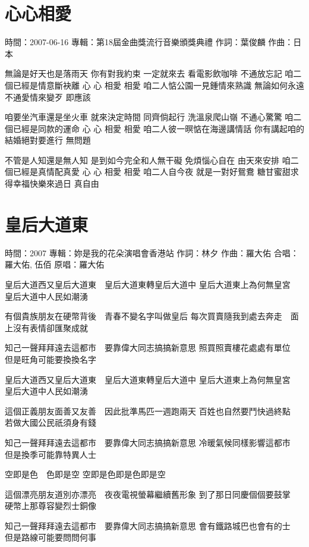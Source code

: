 \documentclass[UTF8,a4paper,oneside,twocolumn,12pt]{ctexbook}
\newcommand{\infopair}[2]{\textbullet #1：#2}
\newcommand{\zc}[1][伍佰]{\infopair{作詞}{#1}}
\newcommand{\zq}[1][伍佰]{\infopair{作曲}{#1}}
\newcommand{\zj}[1]{\infopair{專輯}{#1}}
\newcommand{\yc}[1]{\infopair{原唱}{#1}}
\newcommand{\sj}[1]{\infopair{時間}{#1}}
\newenvironment{info}{\begin{flushleft}\kaishu
	}
	{\end{flushleft}\normalsize\yahei\par}
\newenvironment{lyric}{
	}
{}
\begin{document}
\section{心心相愛}%
\begin{info}
	\sj{2007-06-16}
	\zj{第18屆金曲獎流行音樂頒獎典禮}
	\zc[葉俊麟]
	\zq[日本]
\end{info}
\begin{lyric} %
	無論是好天也是落雨天
	你有對我約束
	一定就來去
	看電影飲咖啡 不通放忘記
	咱二個已經是情意斷袂離
	心 心 相愛 相愛
	咱二人惦公園一見鍾情來熟識
	無論如何永遠不通愛情來變歹
	即應該

	咱要坐汽車還是坐火車
	就來決定時間
	同齊倘起行
	洗溫泉爬山嶺 不通心驚驚
	咱二個已經是同款的運命
	心 心 相愛 相愛
	咱二人彼一暝惦在海邊講情話
	你有講起咱的結婚絕對要進行
	無問題

	不管是人知還是無人知
	是到如今完全和人無干礙
	免煩惱心自在 由天來安排
	咱二個已經是真情配真愛
	心 心 相愛 相愛
	咱二人自今夜 就是一對好鴛鴦
	糖甘蜜甜求得幸福快樂來過日
	真自由
\end{lyric}

\section{皇后大道東}%
\begin{info}
	\sj{2007}
	\zj{妳是我的花朵演唱會香港站}
	\zc[林夕]
	\zq[羅大佑]
	\infopair{合唱}{羅大佑, 伍佰}
	\yc{羅大佑}
\end{info}
\begin{lyric}
	皇后大道西又皇后大道東　皇后大道東轉皇后大道中
	皇后大道東上為何無皇宮　皇后大道中人民如潮湧

	有個貴族朋友在硬幣背後　青春不變名字叫做皇后
	每次買賣隨我到處去奔走　面上沒有表情卻匯聚成就

	知己一聲拜拜遠去這都市　要靠偉大同志搞搞新意思
	照買照賣樓花處處有單位　但是旺角可能要換換名字

	皇后大道西又皇后大道東　皇后大道東轉皇后大道中
	皇后大道東上為何無皇宮　皇后大道中人民如潮湧

	這個正義朋友面善又友善　因此批準馬匹一週跑兩天
	百姓也自然要鬥快過終點　若做大國公民祇須身有錢

	知己一聲拜拜遠去這都市　要靠偉大同志搞搞新意思
	冷暖氣候同樣影響這都市　但是換季可能靠特異人士

	空即是色　色即是空
	空即是色即是色即是空

	這個漂亮朋友道別亦漂亮　夜夜電視螢幕繼續舊形象
	到了那日同慶個個要鼓掌　硬幣上那尊容變烈士銅像

	知己一聲拜拜遠去這都市　要靠偉大同志搞搞新意思
	會有鐵路城巴也會有的士　但是路線可能要問問何事
\end{lyric}
\end{document}
